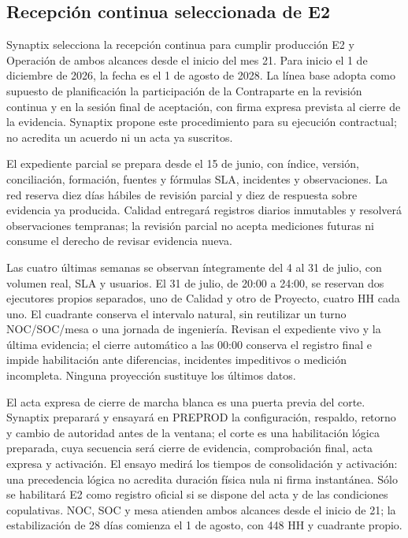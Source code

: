 \subsection{Recepción continua seleccionada de E2}
Synaptix selecciona la recepción continua para cumplir producción E2 y Operación de ambos alcances desde el inicio del mes 21. Para inicio el 1 de diciembre de 2026, la fecha es el 1 de agosto de 2028. La línea base adopta como supuesto de planificación la participación de la Contraparte en la revisión continua y en la sesión final de aceptación, con firma expresa prevista al cierre de la evidencia. Synaptix propone este procedimiento para su ejecución contractual; no acredita un acuerdo ni un acta ya suscritos.~\parencite[arts.~17.2.4, 17.3 y 18; pp.~12--13]{bases-admin}

El expediente parcial se prepara desde el 15 de junio, con índice, versión, conciliación, formación, fuentes y fórmulas SLA, incidentes y observaciones. La red reserva diez días hábiles de revisión parcial y diez de respuesta sobre evidencia ya producida. Calidad entregará registros diarios inmutables y resolverá observaciones tempranas; la revisión parcial no acepta mediciones futuras ni consume el derecho de revisar evidencia nueva.

Las cuatro últimas semanas se observan íntegramente del 4 al 31 de julio, con volumen real, SLA y usuarios. El 31 de julio, de 20:00 a 24:00, se reservan dos ejecutores propios separados, uno de Calidad y otro de Proyecto, cuatro HH cada uno. El cuadrante conserva el intervalo natural, sin reutilizar un turno NOC/SOC/mesa o una jornada de ingeniería. Revisan el expediente vivo y la última evidencia; el cierre automático a las 00:00 conserva el registro final e impide habilitación ante diferencias, incidentes impeditivos o medición incompleta. Ninguna proyección sustituye los últimos datos.

El acta expresa de cierre de marcha blanca es una puerta previa del corte. Synaptix preparará y ensayará en PREPROD la configuración, respaldo, retorno y cambio de autoridad antes de la ventana; el corte es una habilitación lógica preparada, cuya secuencia será cierre de evidencia, comprobación final, acta expresa y activación. El ensayo medirá los tiempos de consolidación y activación: una precedencia lógica no acredita duración física nula ni firma instantánea. Sólo se habilitará E2 como registro oficial si se dispone del acta y de las condiciones copulativas. NOC, SOC y mesa atienden ambos alcances desde el inicio de 21; la estabilización de 28 días comienza el 1 de agosto, con 448 HH y cuadrante propio.

